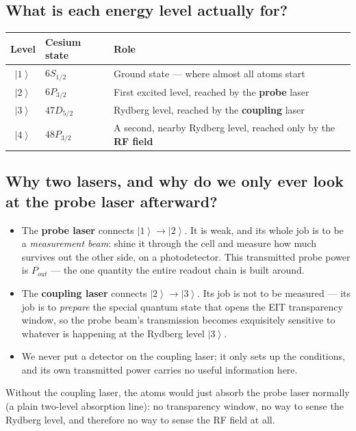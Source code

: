 \documentclass[11pt]{article}
\newcommand{\ket}[1]{\left|#1\right\rangle}
\begin{document}
\subsection*{What is each energy level actually for?}
\begin{center}
\begin{tabular}{@{}cll@{}}
\toprule
Level & Cesium state & Role \\
\midrule
$\ket{1}$ & $6S_{1/2}$ & Ground state --- where almost all atoms start \\
$\ket{2}$ & $6P_{3/2}$ & First excited level, reached by the \textbf{probe} laser \\
$\ket{3}$ & $47D_{5/2}$ & Rydberg level, reached by the \textbf{coupling} laser \\
$\ket{4}$ & $48P_{3/2}$ & A second, nearby Rydberg level, reached only by the \textbf{RF field} \\
\bottomrule
\end{tabular}
\end{center}

\subsection*{Why two lasers, and why do we only ever look at the probe laser afterward?}
\begin{itemize}
\item The \textbf{probe laser} connects $\ket{1}\to\ket{2}$. It is weak, and its whole job is to be a \emph{measurement beam}: shine it through the cell and measure how much survives out the other side, on a photodetector. This transmitted probe power is $P_{out}$ --- the one quantity the entire readout chain is built around.
\item The \textbf{coupling laser} connects $\ket{2}\to\ket{3}$. Its job is not to be measured --- its job is to \emph{prepare} the special quantum state that opens the EIT transparency window, so the probe beam's transmission becomes exquisitely sensitive to whatever is happening at the Rydberg level $\ket{3}$.
\item We never put a detector on the coupling laser; it only sets up the conditions, and its own transmitted power carries no useful information here.
\end{itemize}
\begin{ifnot}
Without the coupling laser, the atoms would just absorb the probe laser normally (a plain two-level absorption line): no transparency window, no way to sense the Rydberg level, and therefore no way to sense the RF field at all.
\end{ifnot}
\end{document}

